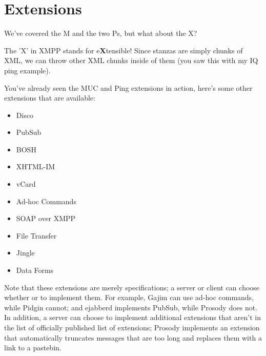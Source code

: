 \section{Extensions}

\pause

We've covered the M and the two Ps, but what about the X?

\pause

The 'X' in XMPP stands for e\textbf{X}tensible!  Since stanzas are simply chunks of XML,
we can throw other XML chunks inside of them (you saw this with my IQ ping example).

\pause
You've already seen the MUC and Ping extensions in action, here's some other extensions that
are available:

\pause
\begin{itemize}
\item Disco
\pause
\item PubSub
\pause
\item BOSH
\pause
\item XHTML-IM
\pause
\item vCard
\pause
\item Ad-hoc Commands
\pause
\item SOAP over XMPP
\pause
\item File Transfer
\pause
\item Jingle
\pause
\item Data Forms
\end{itemize}

\pause

Note that these extensions are merely specifications; a server or client can choose whether or to implement
them.  For example, Gajim can use ad-hoc commands, while Pidgin cannot; and ejabberd implements PubSub, while
Prosody does not.  In addition, a server can choose to implement additional extensions that aren't in the list
of officially published list of extensions; Prosody implements an extension that automatically truncates messages
that are too long and replaces them with a link to a pastebin.
